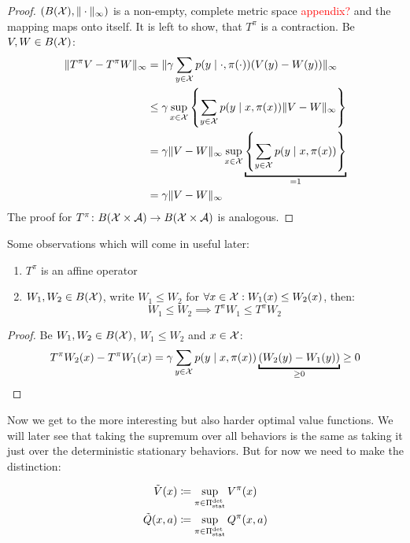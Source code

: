 \begin{proof}
\((B(\mathcal{X}), \|\cdot\|_\infty)\) is a non-empty, complete metric space \textcolor{red}{appendix?} and the mapping maps onto itself. It is left to show, that \(T^\pi\) is a contraction. Be \(V,W\in B(\mathcal{X})\):
\begin{align*}
	\|T^\pi V -T^\pi W\|_\infty &=\|\gamma\sum_{y\in\cX} p(y\mid \cdot,\pi(\cdot)) (V(y)-W(y))\|_\infty\\
	&\le\gamma \sup_{x\in\cX}\left\{ \sum_{y\in\cX} p(y\mid x,\pi(x)) \|V-W\|_\infty \right\}\\
	&=\gamma \|V-W\|_\infty  \sup_{x\in\cX}\underbracket{\left\{ \sum_{y\in\cX} p(y\mid x,\pi(x)) \right\}}_{=1}\\
	&=\gamma \|V-W\|_\infty
\end{align*}
The proof for \(T^\pi\colon B(\mathcal{X}\times\mathcal{A})\to B(\mathcal{X}\times\mathcal{A})\) is analogous.
\end{proof}

\begin{remark}\label{properties T^pi} Some observations which will come in useful later:
	\begin{enumerate}
		\item \(T^\pi\) is an affine operator
		\item \(W_1,W_2\in B(\mathcal{X})\), write \(W_1 \le W_2\) for \(\forall x\in\mathcal{X}:W_1(x)\le W_2(x)\), then:
		\[W_1\le W_2 \implies T^\pi W_1\le T^\pi W_2\]
	\end{enumerate}
\end{remark}

\begin{proof}
 Be \(W_1,W_2\in B(\mathcal{X})\), \(W_1\le W_2\) and \(x\in\mathcal{X}\):
\[
	T^\pi W_2 (x) - T^\pi W_1(x) 
	= \gamma \sum_{y\in\cX} p(y\mid x,\pi(x)) \underbracket{(W_2(y)-W_1(y))}_{\ge 0} 
	\ge 0
	\qedhere
\]
\end{proof}

Now we get to the more interesting but also harder optimal value functions. We will later see that taking the supremum over all behaviors is the same as taking it just over the deterministic stationary behaviors. But for now we need to make the distinction:

\begin{definition}
\begin{align*}
	\tilde{V}(x)&\coloneqq \sup_{\pi\in\Pi_{\textnormal{stat}}^{\textnormal{det}}} V^\pi(x)\\
	\tilde{Q}(x,a)&\coloneqq \sup_{\pi\in\Pi_{\textnormal{stat}}^{\textnormal{det}}} Q^\pi(x,a)
\end{align*}
\end{definition}

